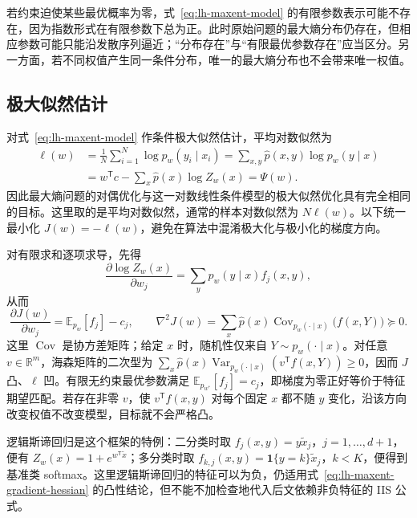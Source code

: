 若约束迫使某些最优概率为零，式~\eqref{eq:lh-maxent-model} 的有限参数表示可能不存在，因为指数形式在有限参数下总为正。此时原始问题的最大熵分布仍存在，但相应参数可能只能沿发散序列逼近；“分布存在”与“有限最优参数存在”应当区分。另一方面，若不同权值产生同一条件分布，唯一的最大熵分布也不会带来唯一权值。

\subsection{极大似然估计}
\label{subsec:lh-maxent-mle}

对式~\eqref{eq:lh-maxent-model} 作条件极大似然估计，平均对数似然为
\begin{equation}
\begin{aligned}
\ell(w)&=\frac1N\sum_{i=1}^N\log p_w(y_i\mid x_i)
=\sum_{x,y}\widehat p(x,y)\log p_w(y\mid x)\\
&=w^{\mathsf T}c-\sum_x\widehat p(x)\log Z_w(x)=\Psi(w).
\end{aligned}
\label{eq:lh-maxent-loglik}
\end{equation}
因此最大熵问题的对偶优化与这一对数线性条件模型的极大似然优化具有完全相同的目标。这里取的是平均对数似然，通常的样本对数似然为 $N\ell(w)$。以下统一最小化 $J(w)=-\ell(w)$，避免在算法中混淆极大化与极小化的梯度方向。

对有限求和逐项求导，先得
\[
\frac{\partial\log Z_w(x)}{\partial w_j}
=\sum_y p_w(y\mid x)f_j(x,y),
\]
从而
\begin{equation}
\frac{\partial J(w)}{\partial w_j}=\mathbb E_{p_w}[f_j]-c_j,
\qquad
\nabla^2J(w)=\sum_x\widehat p(x)
\operatorname{Cov}_{p_w(\cdot\mid x)}\bigl(f(x,Y)\bigr)\succeq0.
\label{eq:lh-maxent-gradient-hessian}
\end{equation}
这里 $\operatorname{Cov}$ 是协方差矩阵；给定 $x$ 时，随机性仅来自 $Y\sim p_w(\cdot\mid x)$。对任意 $v\in\mathbb R^m$，海森矩阵的二次型为 $\sum_x\widehat p(x)\operatorname{Var}_{p_w(\cdot\mid x)}(v^{\mathsf T}f(x,Y))\geq0$，因而 $J$ 凸、$\ell$ 凹。有限无约束最优参数满足 $\mathbb E_{p_{w^*}}[f_j]=c_j$，即梯度为零正好等价于特征期望匹配。若存在非零 $v$，使 $v^{\mathsf T}f(x,y)$ 对每个固定 $x$ 都不随 $y$ 变化，沿该方向改变权值不改变模型，目标就不会严格凸。

逻辑斯谛回归是这个框架的特例：二分类时取 $f_j(x,y)=y\widetilde x_j$，$j=1,\ldots,d+1$，便有 $Z_w(x)=1+e^{w^{\mathsf T}\widetilde x}$；多分类时取 $f_{k,j}(x,y)=\mathbf1\{y=k\}\widetilde x_j$，$k<K$，便得到基准类 softmax。这里逻辑斯谛回归的特征可以为负，仍适用式~\eqref{eq:lh-maxent-gradient-hessian} 的凸性结论，但不能不加检查地代入后文依赖非负特征的 IIS 公式。

